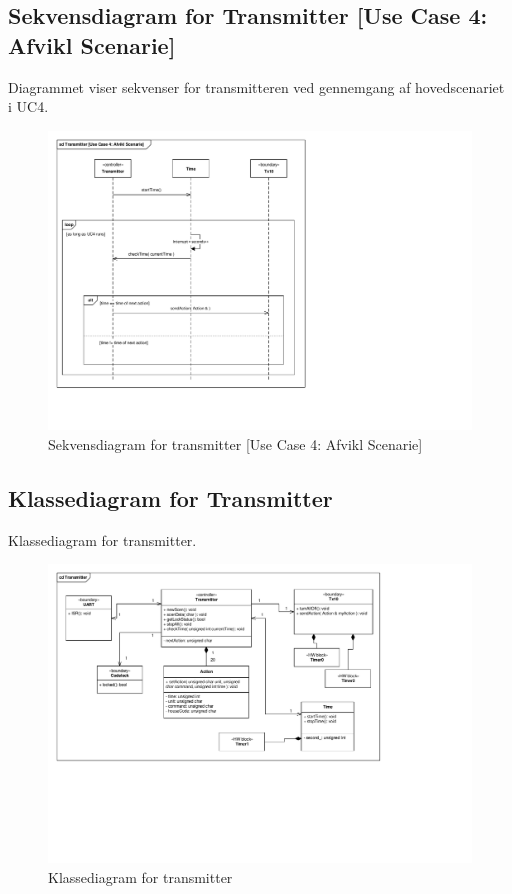 \clearpage

\subsection{Sekvensdiagram for Transmitter [Use Case 4: Afvikl Scenarie]}
Diagrammet viser sekvenser for transmitteren ved gennemgang af hovedscenariet i UC4.
\begin{figure}[h]
	\centering 
	\includegraphics[width={\textwidth},trim=17 75 330 17, clip=true]{Systemarkitektur/Diagrammer/Transmitter_UC4_Sekvens.pdf}
	\caption{Sekvensdiagram for transmitter [Use Case 4: Afvikl Scenarie]}
	\label{fig:Trans_UC4Sek}
\end{figure}

\clearpage

\begin{landscape}
\subsection{Klassediagram for Transmitter}
Klassediagram for transmitter.
\begin{figure}[h]
	\centering 
	\includegraphics[height={\textwidth - 3.5 cm},trim=17 195 180 18, clip=true]{Systemarkitektur/Diagrammer/Transmitter_Klassediagram.pdf}
	\caption{Klassediagram for transmitter}
	\label{fig:Trans_Klasse}
\end{figure}
\end{landscape}

